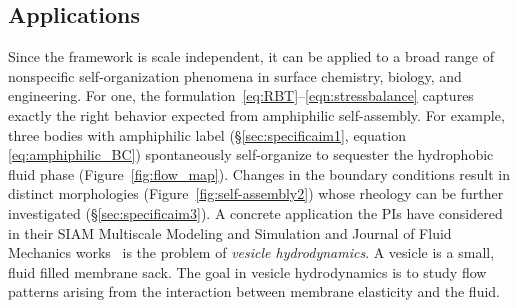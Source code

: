 \subsection{Applications}
Since the framework is scale independent, it can be applied to a broad
range of nonspecific self-organization phenomena in surface chemistry,
biology, and engineering. For one, the
formulation~\eqref{eq:RBT}--\eqref{eqn:stressbalance} captures exactly
the right behavior expected from amphiphilic self-assembly. For example,
three bodies with amphiphilic label (\S\ref{sec:specificaim1}, equation
\eqref{eq:amphiphilic_BC}) spontaneously self-organize to sequester the
hydrophobic fluid phase (Figure~\ref{fig:flow_map}). Changes in the
boundary conditions result in distinct morphologies
(Figure~\ref{fig:self-assembly2}) whose rheology can be further
investigated (\S\ref{sec:specificaim3}).
%
A concrete application the PIs have considered in their SIAM Multiscale
Modeling and Simulation and Journal of Fluid Mechanics
works~\cite{Fu2018_SIAM, FuQuRyYo22} is the problem of \emph{vesicle
hydrodynamics}. A vesicle is a small, fluid filled membrane sack. The
goal in vesicle hydrodynamics is to study flow patterns arising from the
interaction between membrane elasticity and the fluid.

